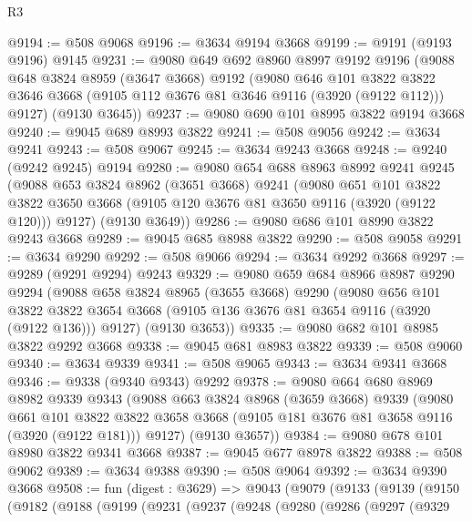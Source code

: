 \begin{lexlean}{R3}
\begin{coremodule}
@9194 := @508 @9068
@9196 := @3634 @9194 @3668
@9199 := @9191 (@9193 @9196) @9145
@9231 := @9080
    @649
    @692
    @8960
    @8997
    @9192
    @9196
    (@9088
      @648
      @3824
      @8959
      (@3647 @3668)
      @9192
      (@9080
        @646
        @101
        @3822
        @3822
        @3646
        @3668
        (@9105 @112 @3676 @81 @3646 @9116 (@3920 (@9122 @112)))
        @9127)
      (@9130 @3645))
@9237 := @9080 @690 @101 @8995 @3822 @9194 @3668
@9240 := @9045 @689 @8993 @3822
@9241 := @508 @9056
@9242 := @3634 @9241
@9243 := @508 @9067
@9245 := @3634 @9243 @3668
@9248 := @9240 (@9242 @9245) @9194
@9280 := @9080
    @654
    @688
    @8963
    @8992
    @9241
    @9245
    (@9088
      @653
      @3824
      @8962
      (@3651 @3668)
      @9241
      (@9080
        @651
        @101
        @3822
        @3822
        @3650
        @3668
        (@9105 @120 @3676 @81 @3650 @9116 (@3920 (@9122 @120)))
        @9127)
      (@9130 @3649))
@9286 := @9080 @686 @101 @8990 @3822 @9243 @3668
@9289 := @9045 @685 @8988 @3822
@9290 := @508 @9058
@9291 := @3634 @9290
@9292 := @508 @9066
@9294 := @3634 @9292 @3668
@9297 := @9289 (@9291 @9294) @9243
@9329 := @9080
    @659
    @684
    @8966
    @8987
    @9290
    @9294
    (@9088
      @658
      @3824
      @8965
      (@3655 @3668)
      @9290
      (@9080
        @656
        @101
        @3822
        @3822
        @3654
        @3668
        (@9105 @136 @3676 @81 @3654 @9116 (@3920 (@9122 @136)))
        @9127)
      (@9130 @3653))
@9335 := @9080 @682 @101 @8985 @3822 @9292 @3668
@9338 := @9045 @681 @8983 @3822
@9339 := @508 @9060
@9340 := @3634 @9339
@9341 := @508 @9065
@9343 := @3634 @9341 @3668
@9346 := @9338 (@9340 @9343) @9292
@9378 := @9080
    @664
    @680
    @8969
    @8982
    @9339
    @9343
    (@9088
      @663
      @3824
      @8968
      (@3659 @3668)
      @9339
      (@9080
        @661
        @101
        @3822
        @3822
        @3658
        @3668
        (@9105 @181 @3676 @81 @3658 @9116 (@3920 (@9122 @181)))
        @9127)
      (@9130 @3657))
@9384 := @9080 @678 @101 @8980 @3822 @9341 @3668
@9387 := @9045 @677 @8978 @3822
@9388 := @508 @9062
@9389 := @3634 @9388
@9390 := @508 @9064
@9392 := @3634 @9390 @3668
@9508 := fun (digest : @3629) =>
  @9043
    (@9079
      (@9133
        (@9139
          (@9150
            (@9182
              (@9188
                (@9199
                  (@9231
                    (@9237
                      (@9248
                        (@9280
                          (@9286
                            (@9297
                              (@9329

\end{coremodule}
\end{lexlean}
